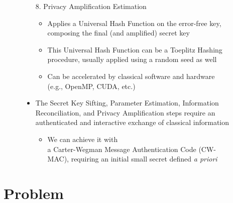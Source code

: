 \documentclass{beamer}
\begin{document}
\begin{frame}
\begin{figure}
\begin{minipage}{0.4\textwidth}
                    \caption{\color{blue}{Figure 2: }\color{black}{Flowchart of a QKD protocol}}
                    \label{fig:qkd-protocol-flowchart}
                \end{minipage}%
                \hspace{0.05\textwidth}%
                \begin{minipage}{0.55\textwidth}
                    \begin{enumerate}\footnotesize
                        \item[8.] Privacy Amplification Estimation
                        \begin{itemize}\scriptsize
                            \item Applies a Universal Hash Function on the error-free key, composing the final (and amplified) secret key
                            \item This Universal Hash Function can be a Toeplitz Hashing procedure, usually applied using a random seed as well
                            \item Can be accelerated by classical software and hardware\\(e.g., OpenMP, CUDA, etc.)
                        \end{itemize}
                    \end{enumerate}

                    \begin{itemize}\footnotesize
                        \item The Secret Key Sifting, Parameter Estimation, Information Reconciliation, and Privacy Amplification steps require an authenticated and interactive exchange of classical information
                        \begin{itemize}\scriptsize
                            \item We can achieve it with\\ a Carter-Wegman Message Authentication Code (CW-MAC), requiring an initial small secret defined \textit{a priori}
                        \end{itemize}
                    \end{itemize}
                \end{minipage}
            \end{figure}
   
		\end{frame}

  
	\section{Problem}
\end{document}

